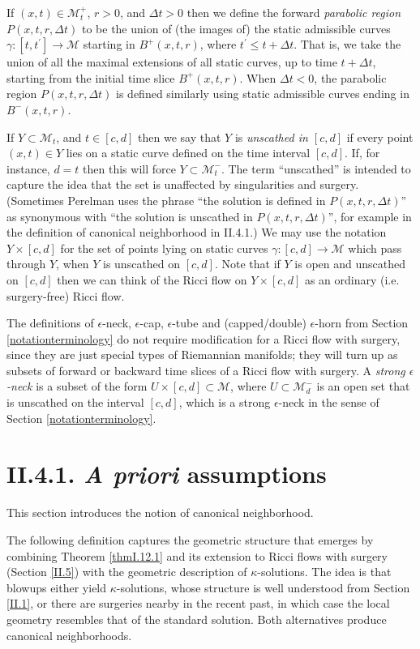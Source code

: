 \documentclass[12pt]{amsart}
\newcommand{\De}{\Delta}
\newcommand{\M}{{\mathcal M}}
\newcommand{\eps}{\epsilon}
\newcommand{\ga}{\gamma}
\newcommand{\ra}{\rightarrow}
\numberwithin{equation}{section}
\theoremstyle{plain}
\theoremstyle{definition}
\theoremstyle{remark}
\begin{document}
If $(x,t)\in\M_t^+$, $r>0$, and $\De t>0$ then we define the 
forward {\em parabolic region } 
$P(x,t,r,\De t)$ to be the union of 
(the images of) the static
admissible curves $\ga:[t,t^\prime] \ra \M$ starting in $B^+(x,t,r)$, where
$t^\prime \le t+\De t$. That is, we take the union of all the maximal
extensions of all static
curves, up to time $t + \De t$, starting from the
initial time slice $B^+(x,t,r)$.
When $\De t<0$, the parabolic region $P(x,t,r,\De t)$ is defined 
similarly using static admissible curves ending in $B^-(x,t,r)$.

If $Y\subset \M_t$, and $t\in[c,d]$ then we say that $Y$ 
is {\em unscathed in $[c,d]$} if every point $(x,t)\in Y$
lies on  a static curve defined on the time
interval $[c,d]$.  If, for instance, $d=t$ then this will force
$Y\subset \M_t^-$.  
The term ``unscathed'' is intended to capture the idea that 
the set is unaffected by singularities and surgery.
(Sometimes Perelman uses the phrase 
``the solution is defined in $P(x,t,r,\De t)$'' as synonymous with
``the solution is unscathed in $P(x,t,r,\De t)$'', for example in
the definition of canonical neighborhood in II.4.1.)
We  may use the 
notation  $Y\times [c,d]$ for the set of points lying on static
curves $\ga:[c,d]\ra\M$ which pass through $Y$, when
$Y$ is unscathed on $[c,d]$.
Note that if $Y$ is open and
unscathed on $[c,d]$ then we can think of the Ricci flow on $Y\times [c,d]$
as an ordinary (i.e. surgery-free) Ricci flow.

The definitions of $\eps$-neck, $\eps$-cap, $\eps$-tube and
(capped/double) $\eps$-horn 
from Section \ref{notationterminology}
do not require modification for 
a Ricci flow with surgery, since they are just special types of Riemannian 
manifolds; they will turn up as subsets of forward or backward 
time slices of a Ricci flow with surgery. A {\em strong $\eps$-neck} 
is a subset  of the form $U\times [c,d]\subset \M$, where $U\subset \M_d^-$
is an open set  that is unscathed on the interval $[c,d]$, 
which is a strong $\eps$-neck in the sense of 
Section \ref{notationterminology}. 


\section{II.4.1. {\it A priori} assumptions}

This section introduces the notion of canonical neighborhood.

The following definition captures the geometric structure that
emerges by combining Theorem \ref{thmI.12.1} and its extension
to Ricci flows with surgery (Section \ref{II.5})
with the geometric description of $\kappa$-solutions.   The idea
is that blowups either yield $\kappa$-solutions, whose
structure is well understood from Section \ref{II.1}, or there are surgeries nearby
in the recent  past, in which case the local geometry resembles
that of the standard solution.   Both alternatives produce canonical
neighborhoods.
\end{document}

